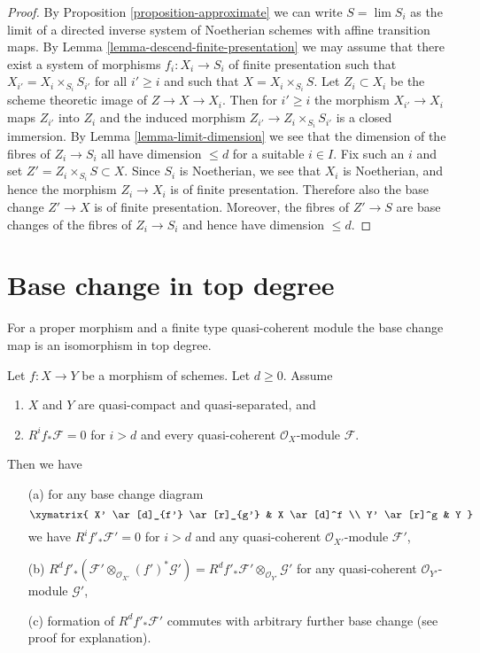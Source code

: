 \begin{proof}
By
Proposition \ref{proposition-approximate}
we can write $S = \lim S_i$ as the limit of a directed inverse
system of Noetherian schemes with affine transition maps. By
Lemma \ref{lemma-descend-finite-presentation}
we may assume that there exist a system of morphisms
$f_i : X_i \to S_i$ of finite presentation such that
$X_{i'} = X_i \times_{S_i} S_{i'}$
for all $i' \geq i$ and such that $X = X_i \times_{S_i} S$.
Let $Z_i \subset X_i$ be the scheme theoretic image of
$Z \to X \to X_i$. Then for $i' \geq i$ the morphism $X_{i'} \to X_i$
maps $Z_{i'}$ into $Z_i$ and the induced morphism
$Z_{i'} \to Z_i \times_{S_i} S_{i'}$ is a closed immersion. By
Lemma \ref{lemma-limit-dimension}
we see that the dimension of the fibres of $Z_i \to S_i$
all have dimension $\leq d$ for a suitable $i \in I$.
Fix such an $i$ and set $Z' = Z_i \times_{S_i} S \subset X$.
Since $S_i$ is Noetherian, we see that $X_i$ is Noetherian, and hence
the morphism $Z_i \to X_i$ is of finite presentation.
Therefore also the base change $Z' \to X$ is of finite presentation.
Moreover, the fibres of $Z' \to S$ are base changes of the fibres
of $Z_i \to S_i$ and hence have dimension $\leq d$.
\end{proof}






\section{Base change in top degree}
\label{section-top-degree}

\noindent
For a proper morphism and a finite type quasi-coherent module
the base change map is an isomorphism in top degree.

\begin{lemma}
\label{lemma-top-cohomology-functor}
Let $f : X \to Y$ be a morphism of schemes. Let $d \geq 0$. Assume
\begin{enumerate}
\item $X$ and $Y$ are quasi-compact and quasi-separated, and
\item $R^if_*\mathcal{F} = 0$ for $i > d$ and
every quasi-coherent $\mathcal{O}_X$-module $\mathcal{F}$.
\end{enumerate}
Then we have
\begin{enumerate}
\item[(a)] for any base change diagram
$$
\xymatrix{
X' \ar[d]_{f'} \ar[r]_{g'} & X \ar[d]^f \\
Y' \ar[r]^g & Y
}
$$
we have $R^if'_*\mathcal{F}' = 0$ for $i > d$ and any quasi-coherent
$\mathcal{O}_{X'}$-module $\mathcal{F}'$,
\item[(b)]
$R^df'_*(\mathcal{F}' \otimes_{\mathcal{O}_{X'}} (f')^*\mathcal{G}') =
R^df'_*\mathcal{F}' \otimes_{\mathcal{O}_{Y'}} \mathcal{G}'$
for any quasi-coherent $\mathcal{O}_{Y'}$-module $\mathcal{G}'$,
\item[(c)] formation of $R^df'_*\mathcal{F}'$ commutes with arbitrary
further base change (see proof for explanation).
\end{enumerate}
\end{lemma}


